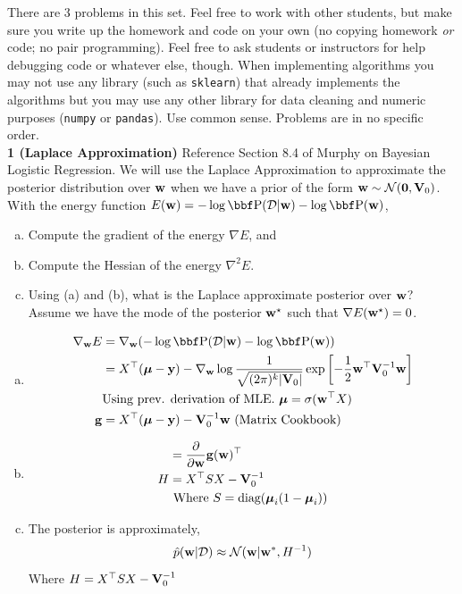 \documentclass[12pt,letterpaper,fleqn]{hmcpset}
\begin{document}
There are 3 problems in this set.
Feel free to work with other students, but make sure you write up the homework
and code on your own (no copying homework \textit{or} code; no pair programming).
Feel free to ask students or instructors for help debugging code or whatever else,
though.
When implementing algorithms you may not use any library (such as \texttt{sklearn})
that already implements the algorithms but you may use any other library for
data cleaning and numeric purposes (\texttt{numpy} or \texttt{pandas}). Use common
sense. Problems are in no specific order.\\[1em]

\textbf{1 (Laplace Approximation)} Reference Section 8.4 of Murphy on Bayesian Logistic Regression. We will
use the Laplace Approximation to approximate the posterior distribution over
${\bf w}$ when we have a prior of the form ${\bf w} \sim {\cal N}({\bf 0}, {\bf V}_0)$. With the energy
function $E(\ww) = -\log\PP(\Dc|\ww) - \log\PP(\ww)$,
\begin{enumerate}[(a)]
    \item Compute the gradient of the energy $\nabla E$, and
    \item Compute the Hessian of the energy $\nabla^2 E$.
    \item Using (a) and (b), what is the Laplace approximate posterior over
        ${\bf w}$? Assume we have the mode of the posterior ${\bf w}^\star$ such
        that $\nabla E({\bf w}^\star) = 0$.
\end{enumerate}
    \begin{enumerate}[(a)]
        \item
            \begin{align*}
                 \nabla_\ww E &= \nabla_\ww (-\log\PP(\Dc|\ww) - \log\PP(\ww)) \\
                 &=  X^\T(\mub-\yy) - \nabla_\ww\log \frac{1}{\sqrt{(2\pi)^k|\Vb_0|}} \exp \left[-\frac12 \ww^\T \Vb_0^{-1} \ww \right]\\ &\text{Using prev. derivation of MLE. $\mub = \sigma(\ww^\T X)$}\\
                 \gg &= X^\T(\mub-\yy) - \Vb_0^{-1} \ww \text{ (Matrix Cookbook)}\\
             \end{align*} 
        \item
           \begin{align*}
                &= \frac\partial{\partial {\bf w}} {\bf g}({\bf w})^\top \\
                H &=  X^\top S X - {\bf V}_0^{-1} \\
                & \text{ Where $S = {\hbox{diag}}(\hbox{\boldmath$\mu$}_i(1-\hbox{\boldmath$\mu$}_i))$} \\
            \end{align*}
        \item
        	The posterior is approximately,
        	$$
        		\hat{p}({\bf w}|{\cal D}) \approx {\cal N} ({\bf w}|{\bf w}^*, H^{-1})
        	$$
        	Where $H = X^\top S X - {\bf V}_0^{-1}$
    \end{enumerate}
\begin{solution}
    
\end{solution}
\end{document}
